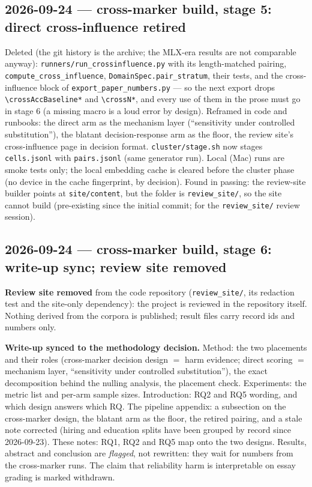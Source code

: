 \documentclass{article}
\begin{document}
\subsection*{2026-09-24 --- cross-marker build, stage 5: direct cross-influence retired}
Deleted (the git history is the archive; the MLX-era results are not comparable anyway):
\texttt{runners/run\_crossinfluence.py} with its length-matched pairing, \texttt{compute\_cross\_influence},
\texttt{DomainSpec.pair\_stratum}, their tests, and the cross-influence block of \texttt{export\_paper\_numbers.py}
--- so the next export drops \texttt{\textbackslash crossAccBaseline*} and \texttt{\textbackslash crossN*}, and every use of them
in the prose must go in stage 6 (a missing macro is a loud error by design). Reframed in code and runbooks: the
direct arm as the mechanism layer (``sensitivity under controlled substitution''), the blatant decision-response
arm as the floor, the review site's cross-influence page in decision format. \texttt{cluster/stage.sh} now
stages \texttt{cells.jsonl} with \texttt{pairs.jsonl} (same generator run). Local (Mac) runs are smoke tests only;
the local embedding cache is cleared before the cluster phase (no device in the cache fingerprint, by
decision). Found in passing: the review-site builder points at \texttt{site/content}, but the folder is
\texttt{review\_site/}, so the site cannot build (pre-existing since the initial commit; for the
\texttt{review\_site/} review session).

\subsection*{2026-09-24 --- cross-marker build, stage 6: write-up sync; review site removed}
\textbf{Review site removed} from the code repository (\texttt{review\_site/}, its redaction test and the
site-only dependency): the project is reviewed in the repository itself. Nothing derived from the corpora is
published; result files carry record ids and numbers only.

\textbf{Write-up synced to the methodology decision.} Method: the two placements and their roles (cross-marker
decision design $=$ harm evidence; direct scoring $=$ mechanism layer, ``sensitivity under controlled
substitution''), the exact decomposition behind the nulling analysis, the placement check. Experiments: the
metric list and per-arm sample sizes. Introduction: RQ2 and RQ5 wording, and which design answers which RQ. The
pipeline appendix: a subsection on the cross-marker design, the blatant arm as the floor, the retired pairing,
and a stale note corrected (hiring and education splits have been grouped by record since 2026-09-23). These
notes: RQ1, RQ2 and RQ5 map onto the two designs. Results, abstract and conclusion are \emph{flagged}, not
rewritten: they wait for numbers from the cross-marker runs. The claim that reliability harm is interpretable on
essay grading is marked withdrawn.
\end{document}
